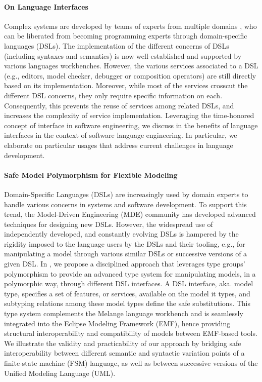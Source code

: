 \paragraph{On Language Interfaces}
Complex systems are developed by teams of experts from multiple domains , who can be liberated from becoming programming experts through domain-specific languages (DSLs). The implementation of the different concerns of DSLs (including syntaxes and semantics) is now well-established and supported by various languages workbenches. However, the various services associated to a DSL (e.g., editors, model checker, debugger or composition operators) are still directly based on its implementation. Moreover, while most of the services crosscut the different DSL concerns, they only require specific information on each. Consequently, this prevents the reuse of services among related DSLs, and increases the complexity of service implementation. Leveraging the time-honored concept of interface in software engineering, we discuss in \cite{degueule:hal-01424909} the benefits of language interfaces in the context of software language engineering. In particular, we elaborate on particular usages that address current challenges in language development.

\paragraph{Safe Model Polymorphism for Flexible Modeling}
Domain-Specific Languages (DSLs) are increasingly used by domain experts to handle various concerns in systems and software development. To support this trend, the Model-Driven Engineering (MDE) community has developed advanced techniques for designing new DSLs. However, the widespread use of independently developed, and constantly evolving DSLs is hampered by the rigidity imposed to the language users by the DSLs and their tooling, e.g., for manipulating a model through various similar DSLs or successive versions of a given DSL. In \cite{degueule:hal-01367305}, we propose a disciplined approach that leverages type groups' polymorphism to provide an advanced type system for manipulating models, in a polymorphic way, through different DSL interfaces. A DSL interface, aka. model type, specifies a set of features, or services, available on the model it types, and subtyping relations among these model types define the safe substitutions. This type system complements the Melange language workbench and is seamlessly integrated into the Eclipse Modeling Framework (EMF), hence providing structural interoperability and compatibility of models between EMF-based tools. We illustrate the validity and practicability of our approach by bridging safe interoperability between different semantic and syntactic variation points of a finite-state machine (FSM) language, as well as between successive versions of the Unified Modeling Language (UML).

